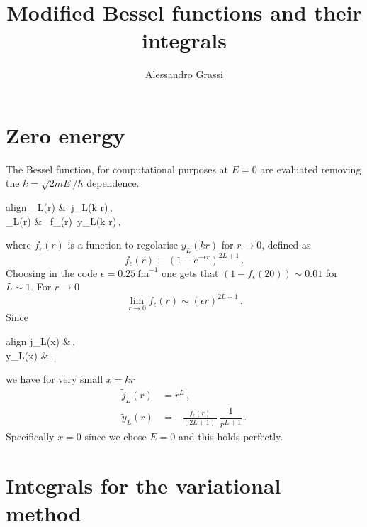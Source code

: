 \documentclass[10pt,a4paper]{article}
\author{Alessandro Grassi}
\title{Modified Bessel functions and their integrals}
\newcommand{\mtm}[1]{\mathrm{#1}}
\begin{document}
	\maketitle
	\tableofcontents
	\section{Zero energy}
	The Bessel function, for computational purposes at $E=0$ are evaluated removing the $k=\sqrt{2mE}/\hbar$ dependence.
	\begin{empheq}[box=\mymath]{align}
		_L(r) &\equiv 
		\,j_L(k r)\,,\\
		_L(r) &\equiv 
		\,
		f_\epsilon(r)\,
		y_L(k r)\,,
	\end{empheq}
	where $f_\epsilon(r)$ is a function to regolarise $y_L(kr)$ for $r\rightarrow 0$, defined as
	\begin{equation}
		f_\epsilon(r) \equiv \left(1-e^{-\epsilon r}\right)^{2L+1}\,.
	\end{equation}
	Choosing in the code $\epsilon=0.25 \mtm{~fm}^{-1}$ one gets that $(1-f_\epsilon(20))\sim0.01$ for $L\sim 1$.
	For $r\rightarrow 0$ 
	\begin{equation}
		\lim_{r\rightarrow0}f_\epsilon(r) \sim (\epsilon r)^{2L+1}\,.
	\end{equation}
	Since
	\begin{empheq}[box=\mymath]{align}
		j_L(x) &\simeq {}\,,\\
		y_L(x) &\simeq -\,,
	\end{empheq}
	we have for very small $x=kr$
	\begin{align}
		\tilde{j}_L(r) &= r^L\,,\\
		\tilde{y}_L(r) &=-\frac{f_\epsilon(r)}{(2L+1)\,}\,\dfrac{1}{r^{L+1}}\,.
	\end{align}
	Specifically $x=0$ since we chose $E=0$ and this holds perfectly. 
	
	\newcommand{\INT}[2]{I_{#1,#2}}
	\section{Integrals for the variational method}
\end{document}
